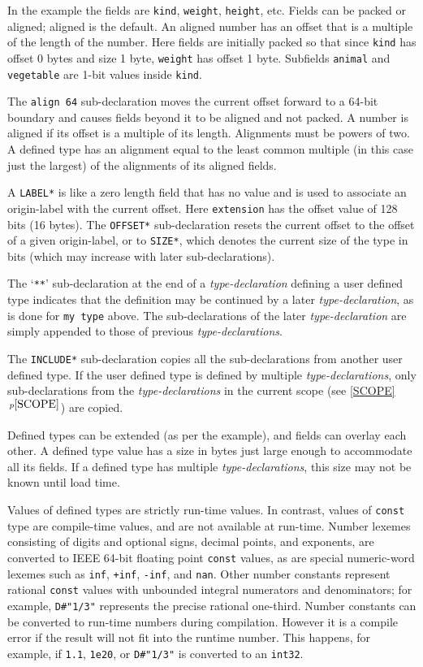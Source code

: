 \documentclass[12pt]{article}
\newcommand{\itemref}[1]{\ref{#1}$\,^{p\pageref{#1}}$}
\begin{document}
In the example the fields are {\tt kind}, {\tt weight}, {\tt height}, etc.
Fields can be packed or aligned; aligned is the default.  An aligned number has an offset
that is a multiple of the length of the number.
Here fields are initially packed
so that since {\tt kind} has offset 0 bytes and size 1 byte,
{\tt weight} has offset 1 byte.  Subfields {\tt animal}
and {\tt vegetable} are 1-bit values inside {\tt kind}.

The {\tt align 64} sub-declaration moves the current offset
forward to a 64-bit boundary and causes fields beyond it
to be aligned and not packed.  A number is aligned if
its offset is a multiple of its length.  Alignments must be powers of two.
A defined type has an
alignment equal to the least common multiple (in this case just the
largest) of the
alignments of its aligned fields.

A {\tt *LABEL*} is like a zero length field that has no value and
is used to associate an origin-label with the current offset.
Here {\tt extension} has the offset value of 128 bits (16 bytes).
The {\tt *OFFSET*} sub-declaration resets the current offset to the offset
of a given origin-label, or to {\tt *SIZE*}, which denotes the current
size of the type in bits (which may increase with later sub-declarations).

The `{\tt ***}' sub-declaration at the end of a
{\em type-declaration} defining a user defined type indicates
that the definition may be continued by a later {\em type-declaration},
as is done for {\tt my type} above.
The sub-declarations of the later {\em type-declaration} are
simply appended to those of previous {\em type-declarations}.

The {\tt *INCLUDE*} sub-declaration copies all the sub-declarations
from another user defined type.
If the user defined type is
defined by multiple {\em type-declarations}, only sub-declarations
from the {\em type-declarations} in the current scope (see \itemref{SCOPE})
are copied.

Defined types can be extended
(as per the example), and fields can overlay each other.
A defined type value has a size in bytes just large enough to
accommodate all its fields.  If a defined type has multiple
{\em type-declarations}, this size may not be known until load time.

Values of defined types are strictly run-time values.  In contrast,
values of {\tt const} type are compile-time values, and are
not available at run-time.  Number lexemes consisting of
digits and optional signs, decimal points, and exponents,
are converted to IEEE 64-bit floating point {\tt const} values, as are
special numeric-word lexemes such as {\tt inf}, {\tt +inf}, {\tt -inf}, and
{\tt nan}.  Other number constants represent
rational {\tt const} values with unbounded integral numerators
and denominators; for example,
{\tt D\#"1/3"} represents the precise rational one-third.
Number constants
can be converted to run-time numbers during compilation.
However it is a compile error
if the result will not fit into the runtime number.
This happens, for example, if {\tt 1.1}, {\tt 1e20}, or {\tt D\#"1/3"}
is converted to an {\tt int32}.
\end{document}
